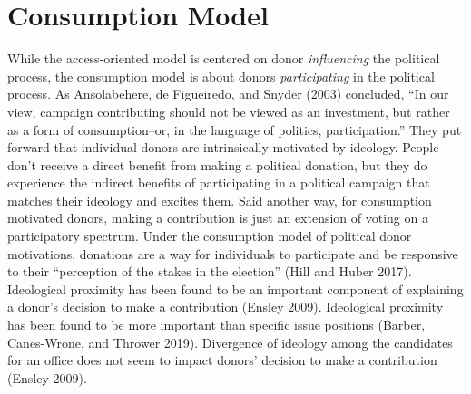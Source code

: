 \documentclass[12pt,]{article}
\begin{document}
\hypertarget{consumption-model}{%
\section{Consumption Model}\label{consumption-model}}

While the access-oriented model is centered on donor \emph{influencing}
the political process, the consumption model is about donors
\emph{participating} in the political process. As Ansolabehere, de
Figueiredo, and Snyder (2003) concluded, ``In our view, campaign
contributing should not be viewed as an investment, but rather as a form
of consumption--or, in the language of politics, participation.'' They
put forward that individual donors are intrinsically motivated by
ideology. People don't receive a direct benefit from making a political
donation, but they do experience the indirect benefits of participating
in a political campaign that matches their ideology and excites them.
Said another way, for consumption motivated donors, making a
contribution is just an extension of voting on a participatory spectrum.
Under the consumption model of political donor motivations, donations
are a way for individuals to participate and be responsive to their
``perception of the stakes in the election'' (Hill and Huber 2017).
Ideological proximity has been found to be an important component of
explaining a donor's decision to make a contribution (Ensley 2009).
Ideological proximity has been found to be more important than specific
issue positions (Barber, Canes-Wrone, and Thrower 2019). Divergence of
ideology among the candidates for an office does not seem to impact
donors' decision to make a contribution (Ensley 2009).
\end{document}
